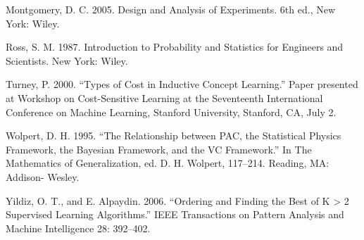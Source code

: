 Montgomery, D. C. 2005. Design and Analysis of Experiments. 6th ed., New York: Wiley.

Ross, S. M. 1987. Introduction to Probability and Statistics for Engineers and Scientists. New York: Wiley.

Turney, P. 2000. “Types of Cost in Inductive Concept Learning.” Paper presented at Workshop on Cost-Sensitive Learning at the Seventeenth International Conference on Machine Learning, Stanford University, Stanford, CA, July 2.

Wolpert, D. H. 1995. “The Relationship between PAC, the Statistical Physics Framework, the Bayesian Framework, and the VC Framework.” In The Mathematics of Generalization, ed. D. H. Wolpert, 117--214. Reading, MA: Addison- Wesley.

Yildiz, O. T., and E. Alpaydin. 2006. “Ordering and Finding the Best of K > 2 Supervised Learning Algorithms.” IEEE Transactions on Pattern Analysis and Machine Intelligence 28: 392--402.
